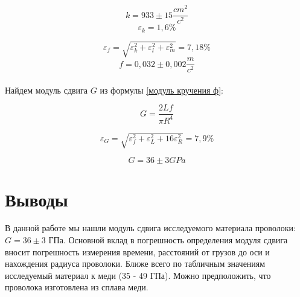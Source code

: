 \[k = 933 \pm 15 \frac{cm^2}{c^2}\]
\[\varepsilon_k =  1,6 \%\]

\[\varepsilon_f = \sqrt{\varepsilon_k^2 + \varepsilon_l^2 + \varepsilon_m^2} = 7,18\%\]
\[f = 0,032 \pm 0,002 \frac{m}{c^2}\]\\

    Найдем модуль сдвига $G$  из формулы \eqref{модуль кручения ф}:
    
\[G = \frac{2L f}{\pi R^4}\]

\[\varepsilon_G = \sqrt{\varepsilon_f^2 + \varepsilon_L^2 + 16\varepsilon_R^2} = 7,9\%\]

\[G = 36 \pm  3 GPa\]
    
    

\section{Выводы}

    В данной работе мы нашли модуль сдвига исследуемого материала проволоки: $G = 36 \pm 3 $ ГПа. Основной вклад в погрешность определения модуля сдвига вносит погрешность измерения времени, расстояний от грузов до оси и нахождения радиуса проволоки. Ближе всего по табличным значениям исследуемый материал к меди (35 - 49 ГПа). Можно предположить, что проволока изготовлена из сплава меди.\\
    
    
    

